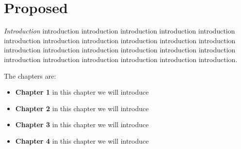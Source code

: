




\section{Proposed}
{\em Introduction} introduction introduction introduction introduction introduction introduction introduction introduction introduction introduction introduction introduction introduction introduction introduction introduction introduction introduction introduction introduction introduction introduction introduction.\newline 


The chapters are:
\begin{itemize}
      \item \textbf{Chapter 1} in this chapter we will introduce
      \item \textbf{Chapter 2} in this chapter we will introduce
      \item \textbf{Chapter 3} in this chapter we will introduce
      \item \textbf{Chapter 4} in this chapter we will introduce
      
\end{itemize}